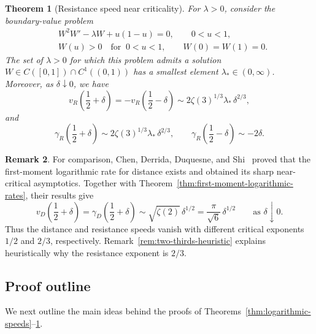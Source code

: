 \documentclass[12pt,preprint]{amsart}
\numberwithin{equation}{section}
\theoremstyle{plain}
\newtheorem{theorem}{Theorem}[section]
\theoremstyle{definition}
\newtheorem{remark}[theorem]{Remark}
\begin{document}
\begin{theorem}[Resistance speed near criticality]
\label{thm:near-critical-speed}
For $\lambda>0$, consider the boundary-value problem
\begin{equation}
\begin{aligned}
 &W^2W'-\lambda W+u(1-u)=0,\qquad 0<u<1,\\
 &W(u)>0\quad\text{for }\ 0<u<1, \qquad
 W(0)=W(1)=0.
\end{aligned}
 \label{eq:main-W-bvp}
\end{equation}
The set of $\lambda>0$ for which this problem admits a solution
$W\in C([0,1])\cap C^1((0,1))$ has a smallest element
$\lambda_*\in(0,\infty)$.  Moreover, as
$\delta\downarrow0$, we have
\begin{equation}
 v_R\left(\frac12+\delta\right)
 =-v_R\left(\frac12-\delta\right)
 \sim2\zeta(3)^{1/3}\lambda_*\,\delta^{2/3},
 \label{eq:main-near-critical-limit}
\end{equation}
and
\begin{equation}
 \gamma_R\left(\frac12+\delta\right)
 \sim2\zeta(3)^{1/3}\lambda_*\,\delta^{2/3},
 \qquad
 \gamma_R\left(\frac12-\delta\right)\sim-2\delta.
 \label{eq:resistance-first-moment-near-critical}
\end{equation}
\end{theorem}

\begin{remark}
For comparison, Chen, Derrida, Duquesne, and
Shi~\cite[equation~(1.2) and Theorem~1]{ChenDerridaDuquesneShi2026} proved
that the first-moment logarithmic rate for distance exists and obtained its
sharp
near-critical asymptotics.  Together with
Theorem~\ref{thm:first-moment-logarithmic-rates}, their results give
\begin{equation*}
 v_D\left(\frac12+\delta\right)=\gamma_D\left(\frac12+\delta\right)
 \sim \sqrt{\zeta(2)}\,\delta^{1/2}
 =\frac{\pi}{\sqrt6}\,\delta^{1/2}
 \qquad\text{as }\delta\downarrow0.
\end{equation*}
Thus the distance and resistance speeds vanish with different critical
exponents $1/2$ and $2/3$, respectively.  Remark~\ref{rem:two-thirds-heuristic}
explains heuristically why the resistance exponent is $2/3$.
\end{remark}

\subsection{Proof outline}

We next outline the main ideas behind the proofs of
Theorems~\ref{thm:logarithmic-speeds}--\ref{thm:near-critical-speed}.
\end{document}
